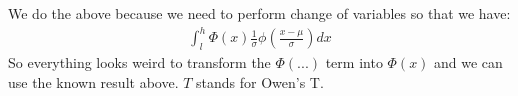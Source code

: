 \documentclass{article}
\begin{document}
We do the above because we need to perform change of variables so that we have:
\begin{align*}
    \int^h_l \Phi(x)\frac{1}{\sigma} \phi(\frac{x - \mu}{\sigma})dx
\end{align*}
So everything looks weird to transform the $\Phi(...)$ term into $\Phi(x)$ and we 
can use the known result above. $T$ stands for Owen's T.
\end{document}
